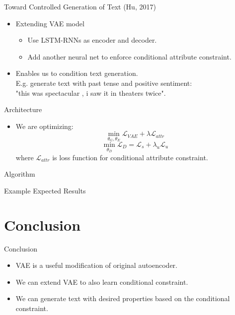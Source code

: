 \documentclass{beamer}
\begin{document}
    \begin{frame}{Toward Controlled Generation of Text (Hu, 2017)}

        \begin{itemize}
            \item Extending VAE model
            \begin{itemize}
                \item Use LSTM-RNNs as encoder and decoder.
                \item Add another neural net to enforce conditional attribute constraint.
            \end{itemize}
            \item Enables us to condition text generation. \\E.g. generate text with past tense and positive sentiment: \\"this was spectacular , i saw it in theaters twice".
        \end{itemize}

    \end{frame}

    \begin{frame}{Architecture}
        \begin{itemize}
            \item We are optimizing:
            $$\min_{\theta_G, \theta_E} \mathcal{L}_{VAE} + \lambda \mathcal{L}_{attr}$$
            $$\min_{\theta_{D}} \mathcal{L}_D = \mathcal{L}_s + \lambda_u \mathcal{L}_u $$
            where $\mathcal{L}_{attr}$ is loss function for conditional attribute constraint.
        \end{itemize}
    \end{frame}

    \begin{frame}{Algorithm}
    \end{frame}

    \begin{frame}{Example Expected Results}
    \end{frame}

    \section{Conclusion}

    \begin{frame}{Conclusion}
        \begin{itemize}
            \item VAE is a useful modification of original autoencoder.
            \item We can extend VAE to also learn conditional constraint.
            \item We can generate text with desired properties based on the conditional constraint.
        \end{itemize}
    \end{frame}

    
\end{document}
